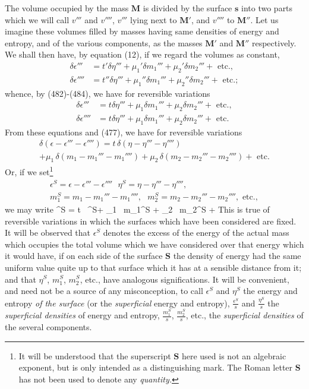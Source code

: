 \documentclass[12pt]{memoir}
\newcommand{\dd}{\delta}
\begin{document}
{The volume occupied by the mass $\mathbf{M}$ is divided by the surface $\mathbf{s}$ into two parts which we will call $v'''$ and $v''''$, $v'''$ lying next to $\mathbf{M}'$, and $v''''$ to $\mathbf{M}''$. Let us imagine these volumes filled by masses having same densities of energy and entropy, and of the various components, as the masses $\mathbf{M}'$ and $\mathbf{M}''$ respectively. We shall then have, by equation (12), if we regard the volumes as constant,
\begin{align}
\dd \epsilon''' &= t'\dd \eta''' + \mu_1' \dd m_1'''+ \mu_2' \dd m_2''' + \text{ etc.},  \label{485} \\
\dd \epsilon'''' &= t''\dd \eta''' + \mu_1'' \dd m_1'''+ \mu_2'' \dd m_2'''  + \text{ etc.}; \label{486} \end{align}
whence, by (482)-(484), we have for reversible variations
\begin{align}
\dd \epsilon''' &= t\dd \eta''' + \mu_1 \dd m_1'''+ \mu_2 \dd m_2''' + \text{ etc.},  \label{487} \\
\dd \epsilon'''' &= t\dd \eta''' + \mu_1 \dd m_1'''+ \mu_2 \dd m_2''' +\text{ etc.}  \label{488} \end{align}
From these equations and (477), we have for reversible variations
\begin{multline}
\dd(\epsilon-\epsilon'''-\epsilon'''') = t \, \dd(\eta-\eta'''-\eta'''') \\
+ \mu_1 \, \dd(m_1-m_1'''-m_1'''')+ \mu_2 \,\dd(m_2-m_2'''-m_2'''')+ \text{ etc.} \label{489} \end{multline}
Or, if we set\footnote{It will be understood that the superscript $\mathbf{S}$ here used is not an algebraic exponent, but is only intended as a distinguishing mark. The Roman letter $\mathbf{S}$ has not been used to denote any \textit{quantity.}}
\begin{gather}
\epsilon^S =\epsilon-\epsilon'''-\epsilon'''' \ \ \ \eta^ S=\eta-\eta'''-\eta'''',\label{490} \\
m_1^S = m_1-m_1'''-m_1'''', \ \ \ m_2^S = m_2-m_2'''-m_2'''', \text{ etc.}, \label{491} \end{gather}
we may write
\eqs \dd \epsilon^S = t \, \dd \eta^S+ \mu_1 \, \dd m_1^S + \mu_2 \, \dd m_2^S +    \label{492} \eqe
This is true of reversible variations in which the surfaces which have been considered are fixed. It will be observed that $\epsilon^S$ denotes the excess of the energy of the actual mass which occupies the total volume which we have considered over that energy which it would have, if on each side of the surface $\mathbf{S}$ the density of energy had the same uniform value quite up to that surface which it has at a sensible distance from it; and that $\eta^S$, $m_1^S$, $m_2^S$, etc., have analogous significations. It will be convenient, and need not be a source of any misconception, to call $\epsilon^S$ and $\eta^S$ the energy and entropy \textit{of the surface} (or the \textit{superficial} energy and entropy), $\frac{\epsilon^S}{s}$ and $\frac{\eta^S}{s}$ the \textit{superficial densities} of energy and entropy, $\frac{m_1^S}{s}$, $\frac{m_2^S}{s}$, etc., the \textit{superficial densities} of the several components.


}
\end{document}
